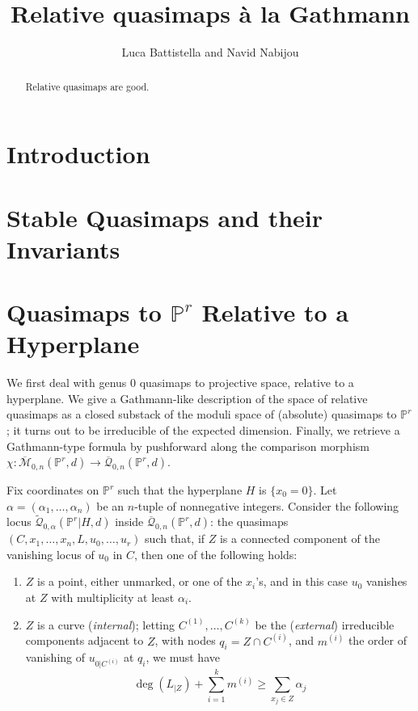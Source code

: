 \documentclass[11pt]{amsart}
\title{Relative quasimaps \`a la Gathmann}
\author{Luca Battistella and Navid Nabijou}
\newcommand{\M}[4]{\overline{\mathcal M}_{#1,#2}(#3,#4)}
\newcommand{\Q}[4]{\overline{\mathcal Q}_{#1,#2}(#3,#4)}
\newcommand{\Qt}[4]{\widetilde{\mathcal Q}_{#1,#2}(#3,#4)}
\newcommand{\PP}{\mathbb P}
\renewcommand{\to}{\rightarrow}
\newcommand{\comp}{\chi}
\theoremstyle{plain}
\theoremstyle{definition}
\begin{document}
\maketitle
\begin{abstract}
Relative quasimaps are good.
\end{abstract}

\tableofcontents

\section{Introduction}

\section{Stable Quasimaps and their Invariants}

\section{Quasimaps to $\PP^r$ Relative to a Hyperplane}

We first deal with genus 0 quasimaps to projective space, relative to a hyperplane. We give a Gathmann-like description of the space of relative quasimaps as a closed substack of the moduli space of (absolute) quasimaps to $\PP^r$; it turns out to be irreducible of the expected dimension. Finally, we retrieve a Gathmann-type formula by pushforward along the comparison morphism $\comp\colon \M{0}{n}{\PP^r}{d}\to\Q{0}{n}{\PP^r}{d}$.

Fix coordinates on $\PP^r$ such that the hyperplane $H$ is $\{x_0=0\}$. Let $\alpha=(\alpha_1,\ldots,\alpha_n)$ be an $n$-tuple of nonnegative integers. Consider the following locus $\Qt{0}{\alpha}{\PP^r|H}{d}$ inside $\Q{0}{n}{\PP^r}{d}$: the quasimaps $(C,x_1,\ldots,x_n,L,u_0,\ldots,u_r)$ such that, if $Z$ is a connected component of the vanishing locus of $u_0$ in $C$, then one of the following holds:

\begin{enumerate}
\item $Z$ is a point, either unmarked, or one of the $x_i$'s, and in this case $u_0$ vanishes at $Z$ with multiplicity at least $\alpha_i$.
\item $Z$ is a curve (\emph{internal}); letting $C^{(1)},\ldots,C^{(k)}$ be the (\emph{external}) irreducible components adjacent to $Z$, with nodes $q_i=Z\cap C^{(i)}$, and $m^{(i)}$ the order of vanishing of $u_{0|C^{(i)}}$ at $q_i$, we must have
\[
\deg(L_{|Z})+\sum_{i=1}^k m^{(i)}\geq\sum_{x_j\in Z} \alpha_j
\]
\end{enumerate}
\end{document}
